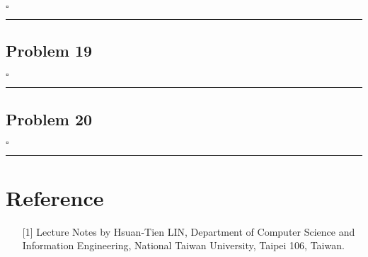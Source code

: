 \documentclass[12pt]{article}
\newcommand*{\QEDB}{\hfill\ensuremath{\square}}
\newcommand{\horrule}[1]{\rule{\linewidth}{#1}}
\begin{document}
\QEDB

\horrule{0.5pt}

\subsection*{Problem 19}

\QEDB

\horrule{0.5pt}

\subsection*{Problem 20}

\QEDB

\horrule{0.5pt}

\section*{Reference}

\begin{enumerate}

\item[{[1]}] Lecture Notes by Hsuan-Tien LIN, Department of Computer Science and Information Engineering, National Taiwan University, Taipei 106, Taiwan.

\end{enumerate}
\end{document}

